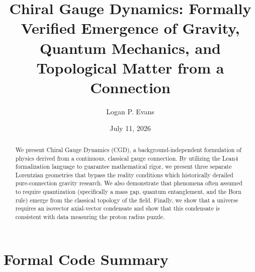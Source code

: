 \documentclass[aps,prd,onecolumn,nofootinbib,11pt,longbibliography]{revtex4-2}
\begin{document}
\title{Chiral Gauge Dynamics: Formally Verified Emergence of Gravity, Quantum Mechanics, and Topological Matter from a \spinFourC Connection}
\author{Logan P. Evans}
\date{July 11, 2026}

\begin{abstract}
  We present Chiral Gauge Dynamics (CGD), a background-independent formulation of physics derived from a continuous, classical \spinFourC gauge connection. By utilizing the Lean4 formalization language to guarantee mathematical rigor, we present three separate Lorentzian geometries that bypass the reality conditions which historically derailed pure-connection gravity research. We also demonstrate that phenomena often assumed to require quantization (specifically a mass gap, quantum entanglement, and the Born rule) emerge from the classical topology of the field. Finally, we show that a \spinFourC universe requires an isovector axial-vector condensate and show that this condensate is consistent with data measuring the proton radius puzzle.
\end{abstract}

\maketitle









\appendix



\section{Formal Code Summary}
\label{sec:code_summary}

\end{document}
